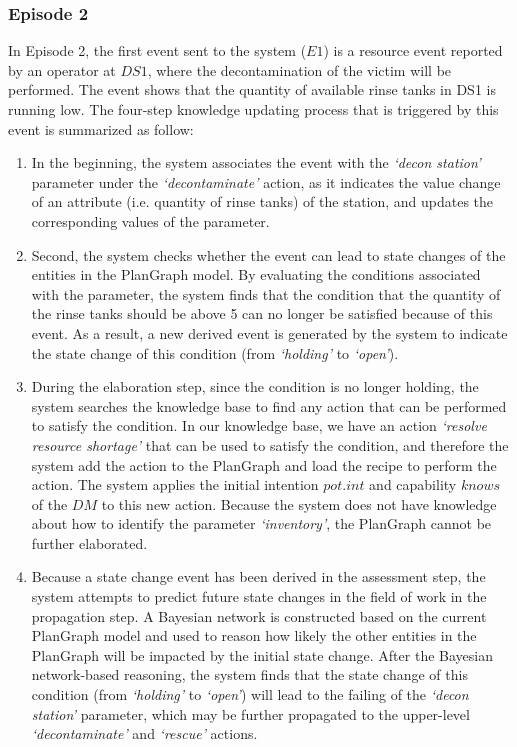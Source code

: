 \subsubsection{Episode 2} %
\label{ssub:episode_2}
In Episode 2, the first event sent to the system ($E1$) is a resource event reported by an operator at $DS1$, where the decontamination of the victim will be performed. The event shows that the quantity of available rinse tanks in DS1 is running low. The four-step knowledge updating process that is triggered by this event is summarized as follow:

\begin{enumerate}
	\item In the beginning, the system associates the event with the \emph{`decon station'} parameter under the \emph{`decontaminate'} action, as it indicates the value change of an attribute (i.e. quantity of rinse tanks) of the station, and updates the corresponding values of the parameter.
	\item Second, the system checks whether the event can lead to state changes of the entities in the PlanGraph model. By evaluating the conditions associated with the parameter, the system finds that the condition that the quantity of the rinse tanks should be above 5 can no longer be satisfied because of this event. As a result, a new derived event is generated by the system to indicate the state change of this condition (from \emph{`holding'} to \emph{`open'}).
	\item During the elaboration step, since the condition is no longer holding, the system searches the knowledge base to find any action that can be performed to satisfy the condition. In our knowledge base, we have an action \emph{`resolve resource shortage'} that can be used to satisfy the condition, and therefore the system add the action to the PlanGraph and load the recipe to perform the action. The system applies the initial intention $pot.int$ and capability $knows$ of the $DM$ to this new action. Because the system does not have knowledge about how to identify the parameter \emph{`inventory'}, the PlanGraph cannot be further elaborated.
	\item Because a state change event has been derived in the assessment step, the system attempts to predict future state changes in the field of work in the propagation step. A Bayesian network is constructed based on the current PlanGraph model and used to reason how likely the other entities in the PlanGraph will be impacted by the initial state change. After the Bayesian network-based reasoning, the system finds that the state change of this condition (from \emph{`holding'} to \emph{`open'}) will lead to the failing of the \emph{`decon station'} parameter, which may be further propagated to the upper-level \emph{`decontaminate'} and \emph{`rescue'} actions.
\end{enumerate}

